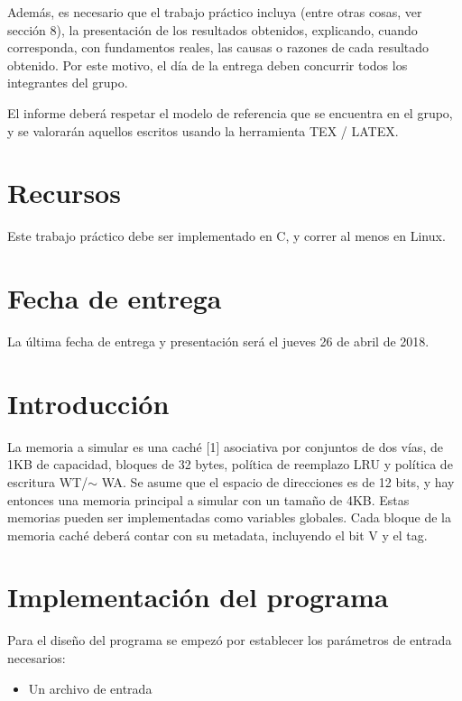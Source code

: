 \documentclass[11pt,a4paper, spanish]{article}
\begin{document}
Además, es necesario que el trabajo práctico incluya (entre otras cosas, ver sección 8), la presentación de los resultados obtenidos, explicando, cuando corresponda, con fundamentos reales, las causas o razones de cada resultado obtenido. Por este motivo, el día de la entrega deben concurrir todos los integrantes del grupo.

El informe deber\'a respetar el modelo de referencia que se encuentra en el grupo, y se valorar\'an aquellos escritos usando la herramienta TEX / LATEX.

\section{Recursos}

Este trabajo práctico debe ser implementado en C, y correr al menos en Linux.

\section{Fecha de entrega}

La última fecha de entrega y presentación ser\'a el jueves 26 de abril de 2018.

\section{Introducción}\label{informe}
La memoria a simular es una caché [1] asociativa por conjuntos de dos
vías, de 1KB de capacidad, bloques de 32 bytes, política de reemplazo LRU
y política de escritura WT/$\sim$ WA. Se asume que el espacio de direcciones es
de 12 bits, y hay entonces una memoria principal a simular con un tamaño
de 4KB. Estas memorias pueden ser implementadas como variables globales.
Cada bloque de la memoria caché deberá contar con su metadata, incluyendo
el bit V y el tag.


\section{Implementaci\'on del programa}

Para el dise\~no del programa se empez\'o por establecer los par\'ametros de entrada necesarios:

\begin{itemize}
\item Un archivo de entrada
\end{itemize}
\end{document}
